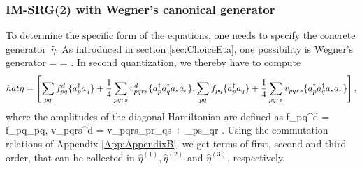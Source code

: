 \subsubsection{IM-SRG(2) with Wegner's canonical generator}
To determine the specific form of the equations, one needs to specify the concrete \mbox{generator $\hat{\eta}$}. 
As introduced in section \ref{sec:ChoiceEta}, one possibility is Wegner's generator
\be
\hat{\eta} = \left[ \Hd, \Ho \right] = .
\ee
In second quantization, we thereby have to compute
\[
\\hat{\eta} = \left[
 \sum\limits_{pq}f_{pq}^d \lbrace a_p^\dagger a_q\rbrace + \frac{1}{4}\sum\limits_{pqrs}v_{pqrs}^d \lbrace a_p^\dagger a_q^\dagger a_s a_r \rbrace,
  \sum\limits_{pq}f_{pq}\lbrace a_p^\dagger a_q\rbrace + \frac{1}{4}\sum\limits_{pqrs}v_{pqrs} \lbrace a_p^\dagger a_q^\dagger a_s a_r \rbrace
\right],
\]
where the amplitudes of the diagonal Hamiltonian are defined as
\be
f_{pq}^d = f_{pq}\delta_{pq}, \qquad v_{pqrs}^d = v_{pqrs}\lb \delta_{pr}\delta_{qs} + \delta_{ps}\delta_{qr} \rb.
\label{eq:diag}
\ee
Using the commutation relations of Appendix \ref{App:AppendixB}, we get terms of first, second and third order, that can be collected in $\hat{\eta}^{(1)}, \hat{\eta}^{(2)}$ and $\hat{\eta}^{(3)}$, respectively. 

